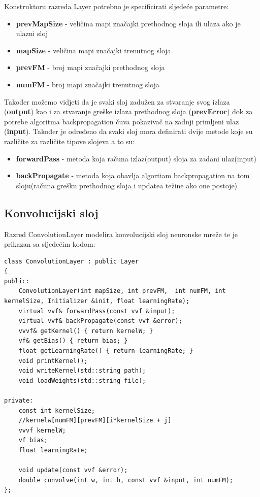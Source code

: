 \documentclass[times, utf8, zavrsni, numeric]{fer}
\begin{document}
Konstruktoru razreda Layer potrebno je specificirati sljedeće parametre:
\begin{itemize}
\item \textbf{prevMapSize} - veličina mapi značajki prethodnog sloja ili ulaza ako je ulazni sloj
\item \textbf{mapSize} - veličina mapi značajki trenutnog sloja
\item \textbf{prevFM} - broj mapi značajki prethodnog sloja
\item \textbf{numFM} - broj mapi značajki trenutnog sloja
\end{itemize}

Također možemo vidjeti da je svaki sloj zadužen za stvaranje svog izlaza (\textbf{output}) kao i za stvaranje greške izlaza prethodnog sloja (\textbf{prevError}) dok za potrebe algoritma backpropagation čuva pokazivač na zadnji primljeni ulaz (\textbf{input}). Također je određeno da svaki sloj mora definirati dvije metode koje su različite za različite tipove slojeva a to su:
\begin{itemize}
\item \textbf{forwardPass} - metoda koja računa izlaz(output) sloja za zadani ulaz(input)
\item \textbf{backPropagate} - metoda koja obavlja algortiam backpropagation na tom sloju(računa grešku prethodnog sloja i updatea težine ako one postoje)
\end{itemize}

\subsection{Konvolucijski sloj}
Razred ConvolutionLayer modelira konvolucijski sloj neuronske mreže te je prikazan sa sljedećim kodom:
\begin{lstlisting}[caption=Razred ConvolutionLayer,
  label=ConvLayer]
class ConvolutionLayer : public Layer
{
public:
    ConvolutionLayer(int mapSize, int prevFM,  int numFM, int kernelSize, Initializer &init, float learningRate); 
    virtual vvf& forwardPass(const vvf &input);
    virtual vvf& backPropagate(const vvf &error);
    vvvf& getKernel() { return kernelW; }
    vf& getBias() { return bias; }
    float getLearningRate() { return learningRate; }
    void printKernel();
    void writeKernel(std::string path);
    void loadWeights(std::string file);

private:
    const int kernelSize;
    //kernelw[numFM][prevFM][i*kernelSize + j]
    vvvf kernelW;
    vf bias;
    float learningRate;

    void update(const vvf &error);
    double convolve(int w, int h, const vvf &input, int numFM);
};
\end{lstlisting}
\end{document}
